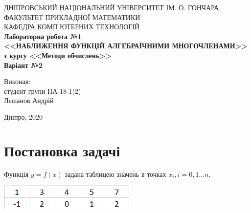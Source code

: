 \documentclass[14pt,a4paper,titlepage]{extarticle}
\begin{document}
      \begin{titlepage}
         \begin{center}
ДНІПРОВСЬКИЙ НАЦІОНАЛЬНИЙ УНІВЕРСИТЕТ ІМ. О. ГОНЧАРА\\
ФАКУЛЬТЕТ ПРИКЛАДНОЇ МАТЕМАТИКИ\\
КАФЕДРА КОМП'ЮТЕРНИХ ТЕХНОЛОГІЙ\\
            \vspace{6cm}
            \bf Лабораторна робота №1\\
            \bf <<НАБЛИЖЕННЯ ФУНКЦІЙ АЛГЕБРАЇЧНИМИ МНОГОЧЛЕНАМИ>>\\
            \bf з курсу <<Методи обчислень>>\\
            \bf Варіант №2
        \end{center}
        \vspace{5cm}
        \begin{flushright}
Виконав:\\
студент групи ПА-18-1(2)\\
Лєшанов Андрій
        \end{flushright}
        \begin{center}
        \vspace{5.5cm}
        Дніпро, 2020
        \end{center}
   \end{titlepage}
\setcounter{page}{2}
\newpage
{\centering\tableofcontents}
\newpage
{\centering \section*{Постановка задачі}}
Функція $y = f(x)$ задана таблицею значень в точках $x_i, i = 0, 1 \ldots n$.\\
\begin{center}


{\includegraphics[scale=1]{6}}
\end{center}
\end{document}
